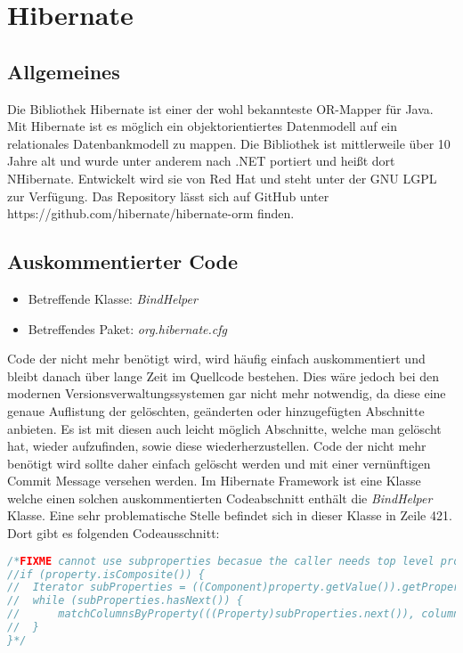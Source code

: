 
\section{Hibernate}
\subsection{Allgemeines}
Die Bibliothek Hibernate ist einer der wohl bekannteste OR-Mapper für Java. Mit Hibernate ist es möglich ein objektorientiertes Datenmodell  auf ein relationales Datenbankmodell zu mappen. Die Bibliothek ist mittlerweile über 10 Jahre alt und wurde unter anderem nach .NET portiert und heißt dort NHibernate. Entwickelt wird sie von Red Hat und steht unter der GNU LGPL zur Verfügung. Das Repository lässt sich auf GitHub unter https://github.com/hibernate/hibernate-orm finden.

\subsection{Auskommentierter Code}
\begin{itemize}
	\item Betreffende Klasse: \textit{BindHelper}
	\item Betreffendes Paket: \textit{org.hibernate.cfg}
\end{itemize}


\SuperPar Code der nicht mehr benötigt wird, wird häufig einfach auskommentiert und bleibt danach über lange Zeit im Quellcode bestehen. Dies wäre jedoch bei den modernen Versionsverwaltungssystemen gar nicht mehr notwendig, da diese eine genaue Auflistung der gelöschten, geänderten oder hinzugefügten Abschnitte anbieten. Es ist mit diesen auch leicht möglich Abschnitte, welche man gelöscht hat, wieder aufzufinden, sowie diese wiederherzustellen. Code der nicht mehr benötigt wird sollte daher einfach gelöscht werden und mit einer vernünftigen Commit Message versehen werden. Im Hibernate Framework ist eine Klasse welche einen solchen auskommentierten Codeabschnitt enthält die \textit{BindHelper} Klasse. Eine sehr problematische Stelle befindet sich in dieser Klasse in Zeile 421. Dort gibt es folgenden Codeausschnitt:

\begin{lstlisting}[language=Java, caption=Beispiele für die Verwendung von \textit{GetByPredicate}, label=lst:GetByPredicate]
/*FIXME cannot use subproperties becasue the caller needs top level properties
//if (property.isComposite()) {
//	Iterator subProperties = ((Component)property.getValue()).getPropertyIterator();
// 	while (subProperties.hasNext()) {
//  	matchColumnsByProperty(((Property)subProperties.next()), columnsToProperty);
// 	}
}*/ 
\end{lstlisting}

